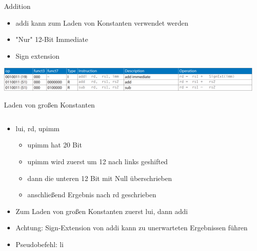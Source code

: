 \documentclass[
  german,            %
  aspectratio=169,    %
]{tumbeamer}
\begin{document}
\begin{frame}[c]{Addition}{}
  \begin{minipage}[t]{\textwidth}
    \vspace{0.2cm} %
    \begin{itemize}
      \item addi kann zum Laden von Konstanten verwendet werden
      \item "Nur"\/  12-Bit Immediate
      \item Sign extension
    \end{itemize}
  \end{minipage}

  \vfill %

  \begin{minipage}[b]{\textwidth}
    \centering
    \includegraphics[width=1\linewidth]{add_sub.png}
  \end{minipage}
\end{frame}

\begin{frame}[c]{Laden von großen Konstanten}{}
  \begin{columns}[c]
    \begin{column}{1\textwidth}
      \begin{itemize}
        \item lui, rd, upimm
        \begin{itemize}
          \item upimm hat 20 Bit
          \item upimm wird zuerst um 12 nach links geshifted
          \item dann die unteren 12 Bit mit Null überschrieben
          \item anschließend Ergebnis nach rd geschrieben
        \end{itemize}
        \item Zum Laden von großen Konstanten zuerst lui, dann addi
        \item Achtung: Sign-Extension von addi kann zu unerwarteten Ergebnissen führen
        \item Pseudobefehl: li
      \end{itemize}
    \end{column}
  \end{columns}
\end{frame}
\end{document}
